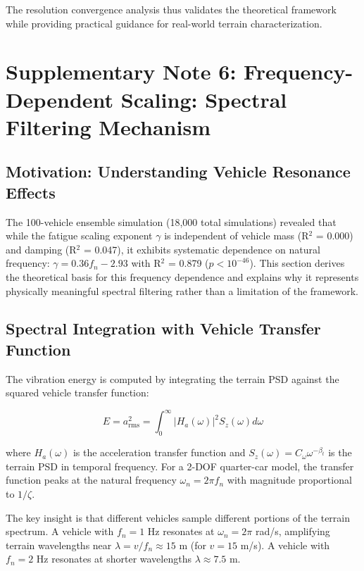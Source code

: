 \documentclass[11pt]{article}
\begin{document}
The resolution convergence analysis thus validates the theoretical framework while providing practical guidance for real-world terrain characterization.


\section{Supplementary Note 6: Frequency-Dependent Scaling: Spectral Filtering Mechanism}

\subsection{Motivation: Understanding Vehicle Resonance Effects}

The 100-vehicle ensemble simulation (18,000 total simulations) revealed that while the fatigue scaling exponent $\gamma$ is independent of vehicle mass (R$^2$ = 0.000) and damping (R$^2$ = 0.047), it exhibits systematic dependence on natural frequency: $\gamma = 0.36 f_n - 2.93$ with R$^2$ = 0.879 ($p < 10^{-46}$). This section derives the theoretical basis for this frequency dependence and explains why it represents physically meaningful spectral filtering rather than a limitation of the framework.

\subsection{Spectral Integration with Vehicle Transfer Function}

The vibration energy is computed by integrating the terrain PSD against the squared vehicle transfer function:

\begin{equation}
E = a_{\text{rms}}^2 = \int_0^\infty |H_a(\omega)|^2 S_z(\omega) d\omega
\end{equation}

where $H_a(\omega)$ is the acceleration transfer function and $S_z(\omega) = C_\omega \omega^{-\beta_t}$ is the terrain PSD in temporal frequency. For a 2-DOF quarter-car model, the transfer function peaks at the natural frequency $\omega_n = 2\pi f_n$ with magnitude proportional to $1/\zeta$.

The key insight is that different vehicles sample different portions of the terrain spectrum. A vehicle with $f_n = 1$ Hz resonates at $\omega_n = 2\pi$ rad/s, amplifying terrain wavelengths near $\lambda = v/f_n \approx 15$ m (for $v = 15$ m/s). A vehicle with $f_n = 2$ Hz resonates at shorter wavelengths $\lambda \approx 7.5$ m.
\end{document}
